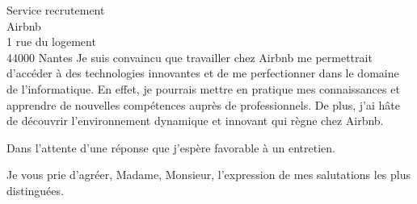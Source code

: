 \documentclass[
    french,
    sender,
    paper=a4,
    version=last,
    fontsize=9pt,
    DIV=12,
    BCOR=0mm
]{scrlttr2}
\begin{document}
\begin{letter}{
    Service recrutement\\
    Airbnb\\
    1 rue du logement\\
    44000 Nantes
}
Je suis convaincu que travailler chez Airbnb me permettrait d'accéder à des technologies innovantes et de me perfectionner dans le domaine de l'informatique. En effet, je pourrais mettre en pratique mes connaissances et apprendre de nouvelles compétences auprès de professionnels. De plus, j'ai hâte de découvrir l'environnement dynamique et innovant qui règne chez Airbnb.

Dans l’attente d’une réponse que j'espère favorable à un entretien.

\closing{Je vous prie d’agréer, Madame, Monsieur, l’expression de mes salutations les plus distinguées.\\}

\end{letter}
\end{document}

